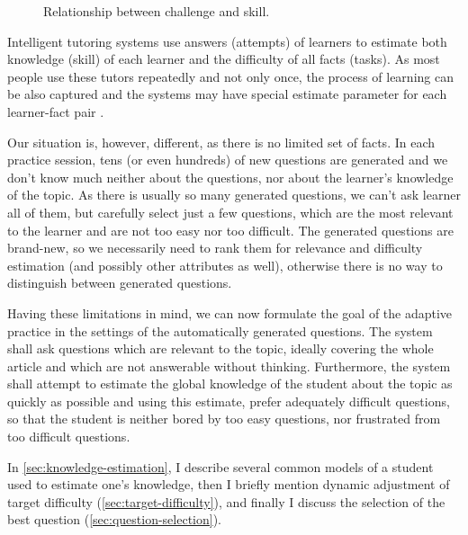 \documentclass[12pt, twoside]{fithesis2}
\renewcommand{\_}{\leavevmode \kern0.07em\vbox{\hrule width0.4em}}
\begin{document}
\begin{figure}[h]
  \centering
  \caption{Relationship between challenge and skill.}
  \label{fig:flow}
\end{figure}

Intelligent tutoring systems use answers (attempts) of learners to estimate both knowledge (skill) of each learner and the difficulty of all facts (tasks).
As most people use these tutors repeatedly and not only once, the process of learning can be also captured
and the systems may have special estimate parameter for each learner-fact pair \cite{slepe-mapy}.

Our situation is, however, different, as there is no limited set of facts.
In each practice session, tens (or even hundreds) of new questions are generated
and we don't know much neither about the questions, nor about the learner's knowledge of the topic.
As there is usually so many generated questions, we can't ask learner all of them,
but carefully select just a few questions, which are the most relevant to the learner and are not too easy nor too difficult.
The generated questions are brand-new, so we necessarily need to rank them for relevance and difficulty estimation (and possibly other attributes as well),
otherwise there is no way to distinguish between generated questions.

Having these limitations in mind, we can now formulate the goal of the adaptive practice in the settings of the automatically generated questions.
The system shall ask questions which are relevant to the topic, ideally covering the whole article and which are not answerable without thinking. Furthermore, the system shall attempt to estimate the global knowledge of the student about the topic as quickly as possible and using this estimate, prefer adequately difficult questions, so that the student is neither bored by too easy questions, nor frustrated from too difficult questions.

In \autoref{sec:knowledge-estimation}, I describe several common models of a student used to estimate one's knowledge, then I briefly mention dynamic adjustment of target difficulty (\autoref{sec:target-difficulty}),
and finally I discuss the selection of the best question (\autoref{sec:question-selection}).
\end{document}
